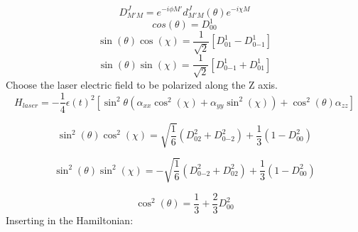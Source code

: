 \documentclass{article}
\newcommand{\D}[3]{D^{#1}_{{#2}{#3}}}%
\newcommand{\redrotmat}[3]{d^{#1}_{{#2}{#3}}(\theta)}
\begin{document}
\begin{equation*}
  \D{J}{M'}{M}=e^{-i\phi M'}\redrotmat{J}{M'}{M}e^{-i\chi M}
\end{equation*}
\begin{equation*}
  cos(\theta)=\D{1}{0}{0}
\end{equation*}
\begin{equation*}
  \sin(\theta)\cos(\chi)= \frac{1}{\sqrt{2}}[\D{1}{0}{1}-\D{1}{0}{-1}]
\end{equation*}
\begin{equation*}
  \sin(\theta)\sin(\chi)= \frac{1}{\sqrt{2}}[\D{1}{0}{-1}+\D{1}{0}{1}]
\end{equation*}
Choose the laser electric field to be polarized along the Z axis. 
\begin{equation*}
  H_{laser}=-\frac{1}{4}\epsilon(t)^2\left[\sin^2\theta(\alpha_{xx}\cos^2(\chi)+\alpha_{yy}\sin^2(\chi))+\cos^2(\theta)\alpha_{zz}\right]
\end{equation*}

\begin{equation*}
  \sin^2(\theta)\cos^2(\chi) = \sqrt{\frac{1}{6}}(\D{2}{0}{2}+\D{2}{0}{-2})+\frac{1}{3}(1-\D{2}{0}{0})
\end{equation*}

\begin{equation*}
  \sin^2(\theta)\sin^2(\chi) = -\sqrt{\frac{1}{6}}(\D{2}{0}{-2}+\D{2}{0}{2})+\frac{1}{3}(1-\D{2}{0}{0})
\end{equation*}

\begin{equation*}
  \cos^2(\theta)=\frac{1}{3}+\frac{2}{3}\D{2}{0}{0}
\end{equation*}
Inserting in the Hamiltonian:
\end{document}
